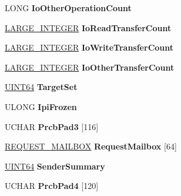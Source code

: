 \begin{DoxyCompactItemize}
L\+O\+NG {\bfseries Io\+Other\+Operation\+Count}
\item 
\mbox{\label{struct___k_p_r_c_b_a9ec7b91dbe4db444bdd73e5d77c59f87}} 
\hyperlink{union___l_a_r_g_e___i_n_t_e_g_e_r}{L\+A\+R\+G\+E\+\_\+\+I\+N\+T\+E\+G\+ER} {\bfseries Io\+Read\+Transfer\+Count}
\item 
\mbox{\label{struct___k_p_r_c_b_af114fd869bbd306a5ec9fdb8e942768e}} 
\hyperlink{union___l_a_r_g_e___i_n_t_e_g_e_r}{L\+A\+R\+G\+E\+\_\+\+I\+N\+T\+E\+G\+ER} {\bfseries Io\+Write\+Transfer\+Count}
\item 
\mbox{\label{struct___k_p_r_c_b_aa9a2cd07f4ad81635d26d92c1de92163}} 
\hyperlink{union___l_a_r_g_e___i_n_t_e_g_e_r}{L\+A\+R\+G\+E\+\_\+\+I\+N\+T\+E\+G\+ER} {\bfseries Io\+Other\+Transfer\+Count}
\item 
\mbox{\label{struct___k_p_r_c_b_a653b2aa9b4d413e1c56b26e261780f4e}} 
\hyperlink{_processor_bind_8h_a57be03562867144161c1bfee95ca8f7c}{U\+I\+N\+T64} {\bfseries Target\+Set}
\item 
\mbox{\label{struct___k_p_r_c_b_ad4aec8b3e5dd24dacdf94bd7daf90ac6}} 
U\+L\+O\+NG {\bfseries Ipi\+Frozen}
\item 
\mbox{\label{struct___k_p_r_c_b_a1440ddf1acf4a4d7ee394402bd5a5d85}} 
U\+C\+H\+AR {\bfseries Prcb\+Pad3} \mbox{[}116\mbox{]}
\item 
\mbox{\label{struct___k_p_r_c_b_aa1eebecbd4bbe17277edbce032a1b523}} 
\hyperlink{struct___r_e_q_u_e_s_t___m_a_i_l_b_o_x}{R\+E\+Q\+U\+E\+S\+T\+\_\+\+M\+A\+I\+L\+B\+OX} {\bfseries Request\+Mailbox} \mbox{[}64\mbox{]}
\item 
\mbox{\label{struct___k_p_r_c_b_ada81b30601ae8c9bc1a56f45bff52812}} 
\hyperlink{_processor_bind_8h_a57be03562867144161c1bfee95ca8f7c}{U\+I\+N\+T64} {\bfseries Sender\+Summary}
\item 
\mbox{\label{struct___k_p_r_c_b_acc42c1abae0501fffbf5a41d09807e8c}} 
U\+C\+H\+AR {\bfseries Prcb\+Pad4} \mbox{[}120\mbox{]}
\item 

\end{DoxyCompactItemize}
